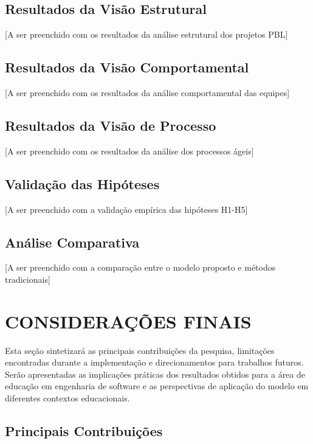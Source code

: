 \documentclass[12pt,a4paper]{article}
\begin{document}
\subsection{Resultados da Visão Estrutural}

[A ser preenchido com os resultados da análise estrutural dos projetos PBL]

\subsection{Resultados da Visão Comportamental}

[A ser preenchido com os resultados da análise comportamental das equipes]

\subsection{Resultados da Visão de Processo}

[A ser preenchido com os resultados da análise dos processos ágeis]

\subsection{Validação das Hipóteses}

[A ser preenchido com a validação empírica das hipóteses H1-H5]

\subsection{Análise Comparativa}

[A ser preenchido com a comparação entre o modelo proposto e métodos tradicionais]

\section{CONSIDERAÇÕES FINAIS}

Esta seção sintetizará as principais contribuições da pesquisa, limitações encontradas durante a implementação e direcionamentos para trabalhos futuros. Serão apresentadas as implicações práticas dos resultados obtidos para a área de educação em engenharia de software e as perspectivas de aplicação do modelo em diferentes contextos educacionais.

\subsection{Principais Contribuições}
\end{document}
